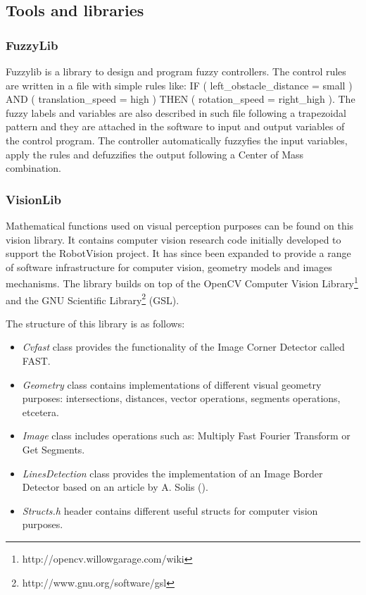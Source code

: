 \documentclass[twocolumn]{svjour3}          %
\begin{document}
\subsection{Tools and libraries}
\label{sec:tools}

\subsubsection{FuzzyLib}

Fuzzylib is a library to design and program fuzzy controllers. The control rules are written in a file with simple rules like: IF ( left\_obstacle\_distance = small ) AND ( translation\_speed = high ) THEN ( rotation\_speed = right\_high ). 
The fuzzy labels and variables are also described in such file following a trapezoidal pattern and they are attached in the software to input and output variables of the control program. The controller automatically fuzzyfies the input variables, apply the rules and defuzzifies the output following a Center of Mass combination.

\subsubsection{VisionLib}
\label{subsec:visionlib}

Mathematical functions used on visual perception purposes can be found on this vision library. It contains computer vision research code initially developed to support the RobotVision project. It has since been expanded to provide a range of software infrastructure for computer vision, geometry models and images mechanisms. The library builds on top of the OpenCV Computer Vision Library\footnote{http://opencv.willowgarage.com/wiki} and the GNU Scientific Library\footnote{http://www.gnu.org/software/gsl} (GSL).

The structure of this library is as follows:
\begin{itemize} 
\item \textit{Cvfast} class provides the functionality of the Image Corner Detector called FAST.
\item \textit{Geometry} class contains implementations of different visual geometry purposes: intersections, distances, vector operations, segments operations, etcetera.
\item \textit{Image} class includes operations such as: Multiply Fast Fourier Transform or Get Segments.
\item \textit{LinesDetection} class provides the implementation of an Image Border Detector based on an article by A. Solis (\cite{solis09}).
\item \textit{Structs.h} header contains different useful structs for computer vision purposes.
\end{itemize}
\end{document}
